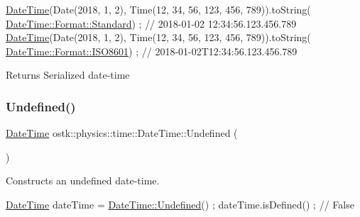 \begin{DoxyCode}
\hyperlink{classostk_1_1physics_1_1time_1_1_date_time_a974b5a7581ae7461ccf0e6ab85e42633}{DateTime}(Date(2018, 1, 2), Time(12, 34, 56, 123, 456, 789)).toString(
      \hyperlink{classostk_1_1physics_1_1time_1_1_date_time_a1d21d982b18bf56ed684fcf1cd97e092aeb6d8ae6f20283755b339c0dc273988b}{DateTime::Format::Standard}) ; \textcolor{comment}{// 2018-01-02 12:34:56.123.456.789}
\hyperlink{classostk_1_1physics_1_1time_1_1_date_time_a974b5a7581ae7461ccf0e6ab85e42633}{DateTime}(Date(2018, 1, 2), Time(12, 34, 56, 123, 456, 789)).toString(
      \hyperlink{classostk_1_1physics_1_1time_1_1_date_time_a1d21d982b18bf56ed684fcf1cd97e092a35b6786739efcdc5a74ab1dca29d3b6b}{DateTime::Format::ISO8601}) ; \textcolor{comment}{// 2018-01-02T12:34:56.123.456.789}
\end{DoxyCode}


\begin{DoxyReturn}{Returns}
Serialized date-\/time 
\end{DoxyReturn}
\mbox{\label{classostk_1_1physics_1_1time_1_1_date_time_a9ca19b137678a1c4a97df8c96a1f3f80}} 
\subsubsection{\texorpdfstring{Undefined()}{Undefined()}}
{\footnotesize\ttfamily \hyperlink{classostk_1_1physics_1_1time_1_1_date_time}{Date\+Time} ostk\+::physics\+::time\+::\+Date\+Time\+::\+Undefined (\begin{DoxyParamCaption}{ }\end{DoxyParamCaption})\hspace{0.3cm}{\ttfamily [static]}}



Constructs an undefined date-\/time. 


\begin{DoxyCode}
\hyperlink{classostk_1_1physics_1_1time_1_1_date_time_a974b5a7581ae7461ccf0e6ab85e42633}{DateTime} dateTime = \hyperlink{classostk_1_1physics_1_1time_1_1_date_time_a9ca19b137678a1c4a97df8c96a1f3f80}{DateTime::Undefined}() ;
dateTime.isDefined() ; \textcolor{comment}{// False}
\end{DoxyCode}


